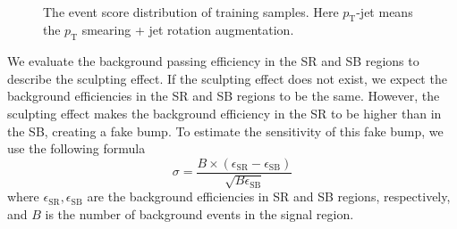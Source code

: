 \documentclass[12pt]{article}
\begin{document}
\begin{figure}[htpb]
{            }
             \\
            \caption{The event score distribution of training samples. Here $p_{\text{T}}$-jet means the $p_{\text{T}}$ smearing + jet rotation augmentation.}
            \label{fig:event_score_train_test_SR_SB_res_25}
        \end{figure}

        We evaluate the background passing efficiency in the SR and SB regions to describe the sculpting effect. If the sculpting effect does not exist, we expect the background efficiencies in the SR and SB regions to be the same. However, the sculpting effect makes the background efficiency in the SR to be higher than in the SB, creating a fake bump. To estimate the sensitivity of this fake bump, we use the following formula
        \begin{equation}
            \sigma = \frac{B\times \left( \epsilon_{\text{SR}} - \epsilon_{\text{SB}} \right)}{\sqrt{B \epsilon_{\text{SB}}}}
        \end{equation}
        where $\epsilon_{\text{SR}}, \epsilon_{\text{SB}}$ are the background efficiencies in SR and SB regions, respectively, and $B$ is the number of background events in the signal region.
\end{document}
